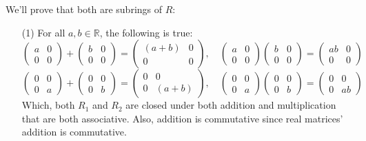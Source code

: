 \documentclass{article}
\begin{document}
We'll prove that both are subrings of $R$:
\begin{itemize}
    \item[(1)] For all $a,b\in\mathbb{R}$, the following is true:
    $$\begin{pmatrix}
        a&0\\0&0
    \end{pmatrix}+\begin{pmatrix}
        b&0\\0&0
    \end{pmatrix}=\begin{pmatrix}
        (a+b)&0\\0&0
    \end{pmatrix},\quad \begin{pmatrix}
        a&0\\0&0
    \end{pmatrix}\begin{pmatrix}
        b&0\\0&0
    \end{pmatrix}=\begin{pmatrix}
        ab&0\\0&0
    \end{pmatrix}$$
    $$\begin{pmatrix}
        0&0\\0&a
    \end{pmatrix}+\begin{pmatrix}
        0&0\\0&b
    \end{pmatrix}=\begin{pmatrix}
        0&0\\0&(a+b)
    \end{pmatrix},\quad \begin{pmatrix}
        0&0\\0&a
    \end{pmatrix}\begin{pmatrix}
        0&0\\0&b
    \end{pmatrix}=\begin{pmatrix}
        0&0\\0&ab
    \end{pmatrix}$$
    Which, both $R_1$ and $R_2$ are closed under both addition and multiplication that are both associative.
    Also, addition is commutative since real matrices' addition is commutative.

    \hfill


\end{itemize}
\end{document}

